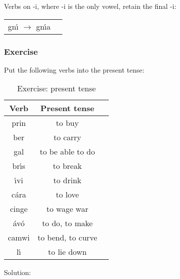 Verbs on -i, where -i is the only vowel, retain the final -i:
\begin{table}[H]
\begin{tabu}{ll}
  gn\'{\i} $\rightarrow$ gn\'{\i}a
\end{tabu}
\label{examples_verbs_on_i_only_vowel}
\end{table}

\newpage
\subsubsection{Exercise}
Put the following verbs into the present tense:
\begin{table}[H]
\centering
\begin{tabu}{|c|c|p{10.0cm}|}
  \toprule
  \textbf{Verb} & \textbf{Present tense}\\
  \toprule
  prin & to buy & \\
  \midrule
  ber & to carry & \\
  \midrule
  gal & to be able to do & \\
  \midrule
  br\'{\i}s & to break & \\
  \midrule
  \'{\i}vi & to drink & \\
  \midrule
  c\'{a}ra & to love & \\
  \midrule
  cinge & to wage war & \\
  \midrule
  \'{a}v\'{o} & to do, to make & \\
  \midrule
  camwi & to bend, to curve & \\
  \midrule
  l\'{\i} & to lie down & \\
  \bottomrule
\end{tabu}
\caption{Exercise: present tense}
\label{exercise_present_tense}
\end{table}

\newpage
Solution:
\begin{table}[H]
\centering
{}
\label{solution_present_tense}
\caption{Solution: present tense}
\end{table}
\newpage

